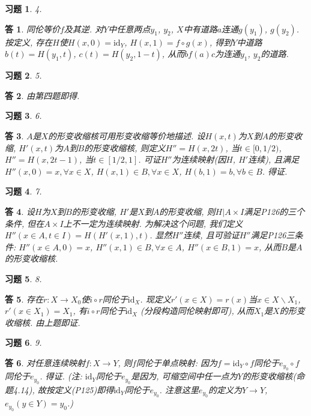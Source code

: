 \documentclass{ctexart}%
\newtheorem*{exercise}{习题}
\newtheorem*{solution}{答}
\theoremstyle{definition}
\theoremstyle{remark}
\begin{document}
\begin{exercise}4.
\end{exercise}
\begin{solution}
同伦等价$f$及其逆. 对$Y$中任意两点$y_1$, $y_2$, $X$中有道路$a$连通$g(y_1)$, $g(y_2)$. 按定义, 存在$H$使$H(x,0)=\text{id}_Y$, $H(x,1)=f\circ g(x)$, 得到$Y$中道路$b(t)=H(y_1,t)$, $c(t)=H(y_2,1-t)$, 从而$bf(a)c$为连通$y_1$, $y_2$的道路. 
\end{solution}

\begin{exercise}5.
\end{exercise}
\begin{solution}
由第四题即得.
\end{solution}

\begin{exercise}6.
\end{exercise}
\begin{solution}
$A$是$X$的形变收缩核可用形变收缩等价地描述. 设$H(x,t)$为$X$到$A$的形变收缩, $H'(x,t)$为$A$到$B$的形变收缩核, 则定义$H''=H(x,2t)$, 当$t\in [0,1/2)$, $H''=H(x,2t-1)$, 当$t\in [1/2,1]$. 可证$H''$为连续映射(因$H$, $H'$连续), 且满足$H''(x,0)=x, \forall x\in X$, $H(x,1)\in B, \forall x\in X$, $H(b,1)=b,\forall b\in B$. 得证.
\end{solution}

\begin{exercise}7.
\end{exercise}
\begin{solution}
设$H$为$X$到$B$的形变收缩, $H'$是$X$到$A$的形变收缩, 则$H|A\times I$满足P126的三个条件, 但在$A\times I$上不一定为连续映射. 为解决这个问题, 我们定义$H''(x\in A,t\in I)=H(H'(x,1),t)$. 显然$H''$连续, 且可验证$H''$满足P126三条件: $H''(x\in A,0)=x$, $H''(x,1)\in B,\forall x\in A$, $H''(x\in B,1)=x$, 从而$B$是$A$的形变收缩核.
\end{solution}

\begin{exercise}8.
\end{exercise}
\begin{solution}
存在$r:X\rightarrow X_0$使$i\circ r$同伦于$\text{id}_X$. 现定义$r'(x\in X)=r(x)$当$x\in X\backslash X_1$, $r'(x\in X_1)=X_1$, 有$i\circ r$同伦于$\text{id}_X$ (分段构造同伦映射即可), 从而$X_1$是$X$的形变收缩核. 由上题即证.
\end{solution}

\begin{exercise}9.
\end{exercise}
\begin{solution}
对任意连续映射$f:X\rightarrow Y$, 则$f$同伦于单点映射: 因为$f=\text{id}_Y\circ f$同伦于$e_{y_0}\circ f$同伦于$e_{y_0}$. 得证. (注: $\text{id}_Y$同伦于$e_{y_0}$是因为, 可缩空间中任一点为$Y$的形变收缩核(命题4.14), 故按定义(P125)即得$\text{id}_Y$同伦于$e_{y_0}$. 注意这里$e_{y_0}$的定义为$Y\rightarrow Y$, $e_{y_0}(y\in Y)=y_0$.)
\end{solution}
\end{document}
